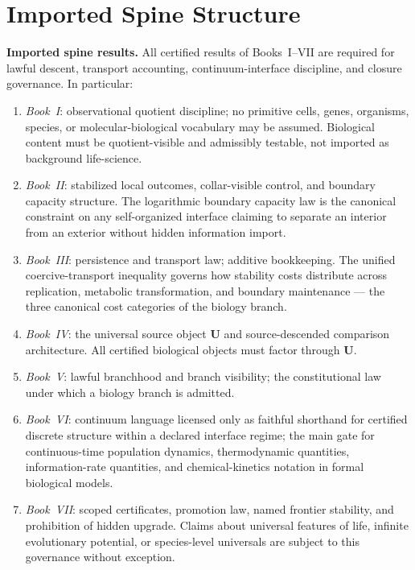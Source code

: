 \documentclass[12pt,oneside]{amsbook}
\theoremstyle{plain}
\theoremstyle{definition}
\theoremstyle{remark}
\begin{document}
\section{Imported Spine Structure}\label{sec:bio-imports}

\textbf{Imported spine results.} All certified results of Books~I--VII
are required for lawful descent, transport accounting, continuum-interface
discipline, and closure governance. In particular:
\begin{enumerate}[label=\textup{(\arabic*)}]
 \item \emph{Book~I}: observational quotient discipline; no primitive
 cells, genes, organisms, species, or molecular-biological
 vocabulary may be assumed. Biological content must be
 quotient-visible and admissibly testable, not imported as
 background life-science.
 \item \emph{Book~II}: stabilized local outcomes, collar-visible
 control, and boundary capacity structure. The logarithmic
 boundary capacity law is the canonical constraint on any
 self-organized interface claiming to separate an interior from an
 exterior without hidden information import.
 \item \emph{Book~III}: persistence and transport law; additive
 bookkeeping. The unified coercive-transport inequality governs how
 stability costs distribute across replication, metabolic
 transformation, and boundary maintenance --- the three canonical
 cost categories of the biology branch.
 \item \emph{Book~IV}: the universal source object $\mathbf{U}$ and
 source-descended comparison architecture. All certified biological
 objects must factor through $\mathbf{U}$.
 \item \emph{Book~V}: lawful branchhood and branch visibility; the
 constitutional law under which a biology branch is admitted.
 \item \emph{Book~VI}: continuum language licensed only as faithful
 shorthand for certified discrete structure within a declared
 interface regime; the main gate for continuous-time population
 dynamics, thermodynamic quantities, information-rate quantities,
 and chemical-kinetics notation in formal biological models.
 \item \emph{Book~VII}: scoped certificates, promotion law, named
 frontier stability, and prohibition of hidden upgrade. Claims
 about universal features of life, infinite evolutionary potential,
 or species-level universals are subject to this governance without
 exception.
\end{enumerate}
\end{document}
